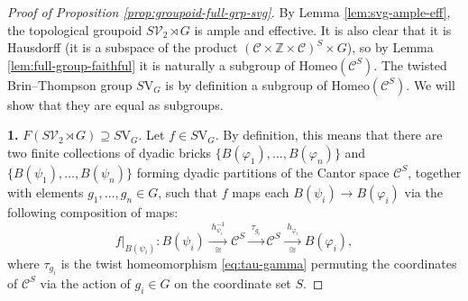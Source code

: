 \documentclass[10pt,a4paper]{amsart}
\numberwithin{equation}{section}
\numberwithin{figure}{section}
\theoremstyle{definition}
\newcommand{\cC}{\mathcal{C}}
\newcommand{\bZ}{\mathbb{Z}}
\newcommand{\Homeo}{\mathrm{Homeo}}
\begin{document}
\begin{proof}[Proof of Proposition \ref{prop:groupoid-full-grp-svg}]
By Lemma \ref{lem:svg-ample-eff}, the topological groupoid $S\mathcal{V}_2 \rtimes {G}$ is ample and effective. It is also clear that it is Hausdorff (it is a subspace of the product $(\cC \times \bZ \times \cC)^S \times G$), so by Lemma \ref{lem:full-group-faithful} it is naturally a subgroup of $\Homeo(\cC^S)$. The twisted Brin--Thompson group $S\mathrm{V}_G$ is by definition a subgroup of $\Homeo(\cC^S)$. We will show that they are equal as subgroups.

\textbf{1.} $F(S\mathcal{V}_2 \rtimes {G}) \supseteq S\mathrm{V}_G$.
Let $f\in S\mathrm{V}_G$. By definition, this means that there are two finite collections of dyadic bricks $\{B(\varphi_{1}), \ldots, B(\varphi_{n})\}$ and $\{B(\psi_{1}), \ldots, B(\psi_{n})\}$ forming dyadic partitions of the Cantor space $\cC^S$, together with elements $g_1, \ldots, g_n\in G$, such that $f$ maps each $B(\psi_i) \to B(\varphi_i)$ via the following composition of maps:
\[
f|_{B(\psi_i)} \colon B(\psi_i) \xrightarrow[\cong]{\; h_{\psi_i}^{-1} \;} \cC^S \xrightarrow[]{\; \tau_{g_i} \;} \cC^S \xrightarrow[\cong]{\; h_{\varphi_i} \;} B(\varphi_i),
\]
where $\tau_{g_i}$ is the twist homeomorphism \eqref{eq:tau-gamma} permuting the coordinates of $\cC^S$ via the action of $g_i \in G$ on the coordinate set $S$.


\end{proof}
\end{document}
